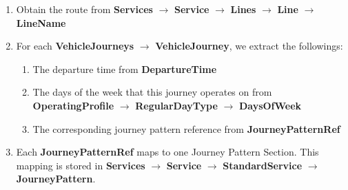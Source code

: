 \begin{enumerate}
  \item Obtain the route from \textbf{Services} $\rightarrow$ \textbf{Service} $\rightarrow$ \textbf{Lines} $\rightarrow$ \textbf{Line} $\rightarrow$ \textbf{LineName}
  \item For each \textbf{VehicleJourneys} $\rightarrow$ \textbf{VehicleJourney}, we extract the followings:
  \begin{enumerate}
    \item The departure time from \textbf{DepartureTime}
    \item The days of the week that this journey operates on from \textbf{OperatingProfile} $\rightarrow$ \textbf{RegularDayType} $\rightarrow$ \textbf{DaysOfWeek}
    \item The corresponding journey pattern reference from \textbf{JourneyPatternRef}
  \end{enumerate}
  \item Each \textbf{JourneyPatternRef} maps to one Journey Pattern Section. This mapping is stored in \textbf{Services} $\rightarrow$ \textbf{Service} $\rightarrow$ \textbf{StandardService} $\rightarrow$ \textbf{JourneyPattern}.


\end{enumerate}

